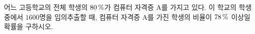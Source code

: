 어느 고등학교의 전체 학생의 $80\mkern3mu \%$가 컴퓨터 자격증 A를 가지고 있다. 이 학교의 학생 중에서 $1600$명을 임의추출할 때, 컴퓨터 자격증 A를 가진 학생의 비율이 $78\mkern3mu \%$ 이상일 확률을 구하시오. 
